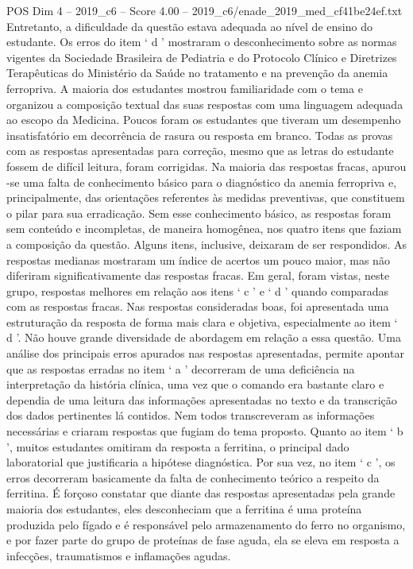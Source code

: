 \begin{textsample}{POS Dim 4 – 2019\_c6 – Score 4.00 – 2019\_c6/enade\_2019\_med\_cf41be24ef.txt}
Entretanto, a dificuldade da questão estava adequada ao nível de ensino do estudante.
Os erros do item ‘ d ’ mostraram o desconhecimento sobre as normas vigentes da Sociedade Brasileira de Pediatria e do Protocolo Clínico e Diretrizes Terapêuticas do Ministério da Saúde no tratamento e na prevenção da anemia ferropriva.
A maioria dos estudantes mostrou familiaridade com o tema e organizou a composição textual das suas respostas com uma linguagem adequada ao escopo da Medicina.
Poucos foram os estudantes que tiveram um desempenho insatisfatório em decorrência de rasura ou resposta em branco.
Todas as provas com as respostas apresentadas para correção, mesmo que as letras do estudante fossem de difícil leitura, foram corrigidas.
Na maioria das respostas fracas, apurou -se uma falta de conhecimento básico para o diagnóstico da anemia ferropriva e, principalmente, das orientações referentes às medidas preventivas, que constituem o pilar para sua erradicação.
Sem esse conhecimento básico, as respostas foram sem conteúdo e incompletas, de maneira homogênea, nos quatro itens que faziam a composição da questão.
Alguns itens, inclusive, deixaram de ser respondidos.
As respostas medianas mostraram um índice de acertos um pouco maior, mas não diferiram significativamente das respostas fracas.
Em geral, foram vistas, neste grupo, respostas melhores em relação aos itens ‘ c ’ e ‘ d ’ quando comparadas com as respostas fracas.
Nas respostas consideradas boas, foi apresentada uma estruturação da resposta de forma mais clara e objetiva, especialmente ao item ‘ d ’.
Não houve grande diversidade de abordagem em relação a essa questão.
Uma análise dos principais erros apurados nas respostas apresentadas, permite apontar que as respostas erradas no item ‘ a ’ decorreram de uma deficiência na interpretação da história clínica, uma vez que o comando era bastante claro e dependia de uma leitura das informações apresentadas no texto e da transcrição dos dados pertinentes lá contidos.
Nem todos transcreveram as informações necessárias e criaram respostas que fugiam do tema proposto.
Quanto ao item ‘ b ’, muitos estudantes omitiram da resposta a ferritina, o principal dado laboratorial que justificaria a hipótese diagnóstica.
Por sua vez, no item ‘ c ’, os erros decorreram basicamente da falta de conhecimento teórico a respeito da ferritina.
É forçoso constatar que diante das respostas apresentadas pela grande maioria dos estudantes, eles desconheciam que a ferritina é uma proteína produzida pelo fígado e é responsável pelo armazenamento do ferro no organismo, e por fazer parte do grupo de proteínas de fase aguda, ela se eleva em resposta a infecções, traumatismos e inflamações agudas.

\end{textsample}
